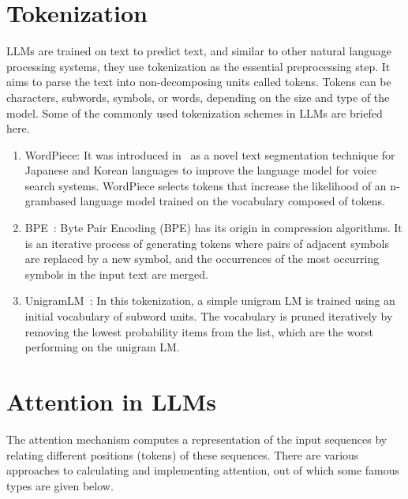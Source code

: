 \documentclass[a4paper,oneside]{book}
\begin{document}
\section{Tokenization}
LLMs are trained on text to predict text, and similar to other natural language processing systems, they use tokenization as the essential preprocessing step. It aims to parse the text into non-decomposing units called tokens. Tokens can be characters, subwords, symbols, or words, depending on the size and type of the model. Some of the commonly used tokenization schemes in LLMs are briefed here.

\begin{enumerate}
  \item WordPiece: It was introduced in~\cite{schuster2012japanese} as a novel text segmentation technique for Japanese and Korean languages to improve the language model for voice search systems. WordPiece selects tokens that increase the likelihood of an n-grambased language model trained on the vocabulary composed of tokens.

  \item BPE~\cite{sennrich2015neural}: Byte Pair Encoding (BPE) has its origin in compression algorithms. It is an iterative process of generating tokens where pairs of adjacent symbols are replaced by a new symbol, and the occurrences of the most occurring symbols in the input text are merged.

  \item UnigramLM~\cite{kudo2018subword}: In this tokenization, a simple unigram LM is trained using an initial vocabulary of subword units. The vocabulary is pruned iteratively by removing the lowest probability items from the list, which are the worst performing on the unigram LM.
\end{enumerate}

\section{Attention in LLMs}
The attention mechanism computes a representation of the input sequences by relating different positions (tokens) of these sequences. There are various approaches to calculating and implementing attention, out of which some famous types are given below.
\end{document}
